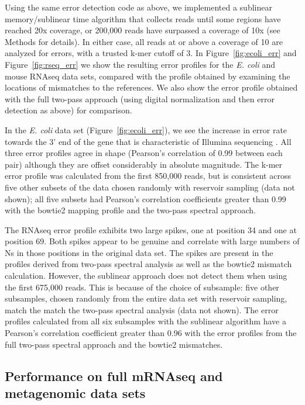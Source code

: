 \documentclass{article}
\begin{document}
Using the same error detection code as above, we implemented a
sublinear memory/sublinear time algorithm that collects reads until
some regions have reached 20x coverage, or 200,000 reads have
surpassed a coverage of 10x (see Methods for details).  In either
case, all reads at or above a coverage of 10 are analyzed for errors,
with a trusted k-mer cutoff of 3.  In Figure~\ref{fig:ecoli_err} and
Figure~\ref{fig:rseq_err} we show the resulting error profiles for the
{\em E. coli} and mouse RNAseq data sets, compared with the profile
obtained by examining the locations of mismatches to the references.
We also show the error profile obtained with the full two-pass approach
(using digital normalization and then error detection as above)
for comparison.

In the {\em E. coli} data set (Figure~\ref{fig:ecoli_err}), we see the
increase in error rate towards the 3' end of the gene that is
characteristic of Illumina sequencing \cite{biases}.  All three error
profiles agree in shape (Pearson's correlation of 0.99 between each
pair) although they are offset considerably in absolute magnitude.
The k-mer error profile was calculated from the first 850,000 reads, but
is consistent across five other subsets of the data chosen randomly
with reservoir sampling (data not shown); all five subsets had
Pearson's correlation coefficients greater than 0.99 with the
bowtie2 mapping profile and the two-pass spectral approach.

The RNAseq error profile exhibits two large spikes, one at position 34
and one at position 69.  Both spikes appear to be genuine and
correlate with large numbers of Ns in those positions in the original
data set.  The spikes are present in the profiles derived from
two-pass spectral analysis as well as the bowtie2 mismatch
calculation.  However, the sublinear approach does not detect them
when using the first 675,000 reads.  This is because of the choice of
subsample: five other subsamples, chosen randomly from the entire data
set with reservoir sampling, match the match the two-pass spectral
analysis (data not shown).  The error profiles calculated from all six
subsamples with the sublinear algorithm have a Pearson's correlation
coefficient greater than 0.96 with the error profiles from the full
two-pass spectral approach and the bowtie2 mismatches.


\subsection{Performance on full mRNAseq and metagenomic data sets}
\end{document}
